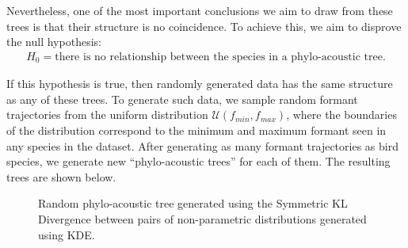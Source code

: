 \documentclass[pdftex,11pt,a4paper]{article}
\theoremstyle{definition}
\theoremstyle{remark}
\begin{document}
\par Nevertheless, one of the most important conclusions we aim to draw from these trees is that their structure is no coincidence. To achieve this, we aim to disprove the null hypothesis:
\begin{align*}
H_0 = \text{there is no relationship between the species in a phylo-acoustic tree.}
\end{align*}
\par If this hypothesis is true, then randomly generated data has the same structure as any of these trees. To generate such data, we sample random formant trajectories from the uniform distribution $\mathcal{U}(f_{min}, f_{max})$, where the boundaries of the distribution correspond to the minimum and maximum formant seen in any species in the dataset. After generating as many formant trajectories as bird species, we generate new ``phylo-acoustic trees'' for each of them. The resulting trees are shown below.
\begin{figure}
\noindent{}
    \caption{Random phylo-acoustic tree generated using the Symmetric KL Divergence between pairs of non-parametric distributions generated using KDE.}
    \label{fig:rkdeskld}
\end{figure}
\end{document}

